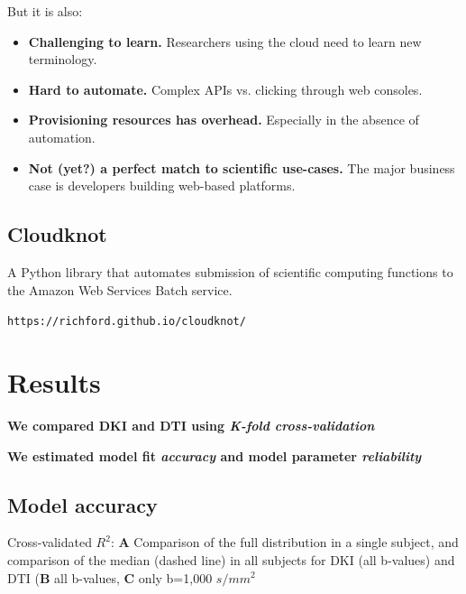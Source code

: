 \documentclass[a0, landscape]{a0poster}
\begin{document}
\begin{multicols}{3}
But it is also:

\begin{itemize}
\item{{\bf Challenging to learn.} Researchers using the cloud need to learn new terminology.}
\item{{\bf Hard to automate.} Complex APIs vs. clicking through web consoles.}
\item{{\bf Provisioning resources has overhead.} Especially in the absence of automation.}
\item{{\bf Not (yet?) a perfect match to scientific use-cases.} The major business case is developers building web-based platforms.}
\end{itemize}

\subsection*{Cloudknot}

A Python library that automates submission of scientific computing functions
to the Amazon Web Services Batch service.

\texttt{https://richford.github.io/cloudknot/}

\section*{Results}

\noindent \textbf{We compared DKI and DTI using \emph{K-fold cross-validation}}

\noindent \textbf{We estimated model fit \emph{accuracy} and model parameter \emph{reliability}}

\subsection*{Model accuracy}
\normalsize

\noindent Cross-validated $R^2$: \textbf{A} Comparison of the full distribution
in a single subject, and comparison of the median (dashed line) in all subjects
for DKI (all b-values) and DTI (\textbf{B} all b-values, \textbf{C} only b=1,000
$s/mm^2$  \hfill \break


\end{multicols}
\end{document}
